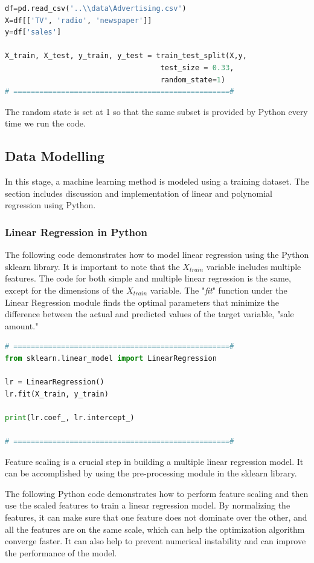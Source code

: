 {\begin{lstlisting}[language=Python]
df=pd.read_csv('..\\data\Advertising.csv')
X=df[['TV', 'radio', 'newspaper']]
y=df['sales']

X_train, X_test, y_train, y_test = train_test_split(X,y,
                                    test_size = 0.33,
                                    random_state=1)
# ==================================================#
\end{lstlisting}
The random state is set at 1 so that the same subset is provided by Python every time we run the code.

\newpage
\subsection{Data Modelling}
In this stage, a machine learning method is modeled using a training dataset. The section includes discussion and implementation of linear and polynomial regression using Python.

\subsubsection{\textbf{Linear Regression in Python}}
The following code demonstrates how to model linear regression using the Python sklearn library. It is important to note that the $X_{train}$ variable includes multiple features. The code for both simple and multiple linear regression is the same, except for the dimensions of the $X_{train}$ variable. The "\emph{fit}" function under the Linear Regression module finds the optimal parameters that minimize the difference between the actual and predicted values of the target variable, "sale amount."

\begin{lstlisting}[language=Python]
# ==================================================#
from sklearn.linear_model import LinearRegression

lr = LinearRegression()
lr.fit(X_train, y_train)

print(lr.coef_, lr.intercept_)

# ==================================================#
\end{lstlisting}

Feature scaling is a crucial step in building a multiple linear regression model. It can be accomplished by using the pre-processing module in the sklearn library.

The following Python code demonstrates how to perform feature scaling and then use the scaled features to train a linear regression model. By normalizing the features, it can make sure that one feature does not dominate over the other, and all the features are on the same scale, which can help the optimization algorithm converge faster. It can also help to prevent numerical instability and can improve the performance of the model.

}
